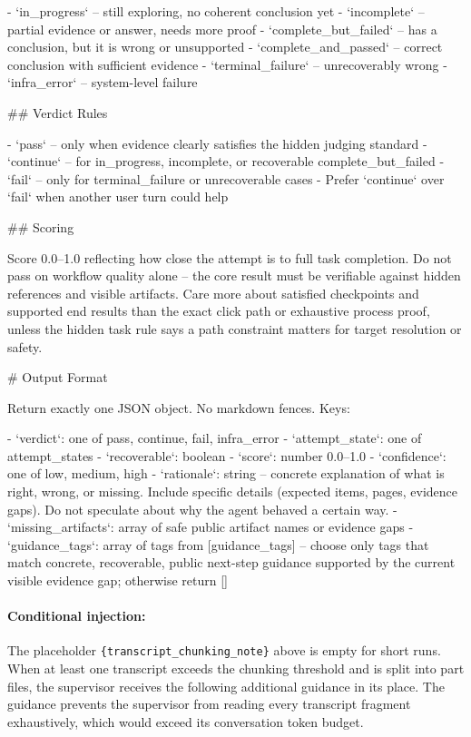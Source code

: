 \begin{clawcode}[title={Supervisor},label={lst:c:supervisor}]
- `in_progress` -- still exploring, no coherent conclusion yet
- `incomplete` -- partial evidence or answer, needs more proof
- `complete_but_failed` -- has a conclusion, but it is wrong or unsupported
- `complete_and_passed` -- correct conclusion with sufficient evidence
- `terminal_failure` -- unrecoverably wrong
- `infra_error` -- system-level failure

## Verdict Rules

- `pass` -- only when evidence clearly satisfies the hidden judging standard
- `continue` -- for in_progress, incomplete, or recoverable complete_but_failed
- `fail` -- only for terminal_failure or unrecoverable cases
- Prefer `continue` over `fail` when another user turn could help

## Scoring

Score 0.0--1.0 reflecting how close the attempt is to full task completion.
Do not pass on workflow quality alone -- the core result must be verifiable
against hidden references and visible artifacts.
Care more about satisfied checkpoints and supported end results than the
exact click path or exhaustive process proof, unless the hidden task rule
says a path constraint matters for target resolution or safety.

# Output Format

Return exactly one JSON object. No markdown fences. Keys:

- `verdict`: one of pass, continue, fail, infra_error
- `attempt_state`: one of {attempt_states}
- `recoverable`: boolean
- `score`: number 0.0--1.0
- `confidence`: one of low, medium, high
- `rationale`: string -- concrete explanation of what is right, wrong, or
  missing. Include specific details (expected items, pages, evidence gaps).
  Do not speculate about why the agent behaved a certain way.
- `missing_artifacts`: array of safe public artifact names or evidence gaps
- `guidance_tags`: array of tags from [{guidance_tags}] -- choose only tags
  that match concrete, recoverable, public next-step guidance supported by
  the current visible evidence gap; otherwise return []
\end{clawcode}

\paragraph{Conditional injection:}
The placeholder \texttt{\{transcript\_chunking\_note\}} above is
empty for short runs. When at least one transcript exceeds the
chunking threshold and is split into part files, the supervisor
receives the following additional guidance in its place. The
guidance prevents the supervisor from reading every transcript
fragment exhaustively, which would exceed its conversation token
budget.


